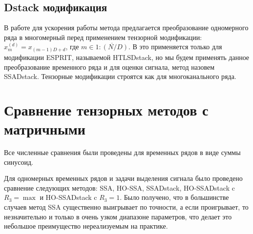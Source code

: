\documentclass[12pt]{article}
\newcommand{\tX}{\mathsf{X}}
\theoremstyle{definition}
\theoremstyle{remark}
\begin{document}
\subsection{Dstack модификация}
В работе \cite{...} для ускорения работы метода предлагается преобразование одномерного ряда в многомерный перед применением тензорной модификации: $x_m^{(d)} = x_{(m-1)D + d}$, где $m \in \overline{1:(N/D)}$. В \cite{...} это применяется только для модификации ESPRIT, называемой HTLSDstack, но мы будем применять данное преобразование временного ряда и для оценки сигнала, метод назовем SSADstack. Тензорные модификации строятся как для многоканального ряда.
%


\section{Сравнение тензорных методов с матричными}
Все численные сравнения были проведены для временных рядов в виде суммы синусоид.

Для одномерных временных рядов и задачи выделения сигнала было проведено сравнение следующих методов:
SSA, HO-SSA, SSADstack, HO-SSADstack c $R_3=\max$ и HO-SSADstack c $R_3=1$. Было получено, что в большинстве случаев метод SSA существенно выигрывает по точности, а если проигрывает, то незначительно и только в очень узком диапазоне параметров, что делает это небольшое преимущество нереализуемым на практике. 
\end{document}
